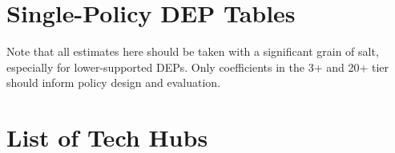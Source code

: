 \documentclass[doublespace,nopageskip]{UVAthesis}
\renewcommand{\arraystretch}{1.2}
\begin{document}
\begin{appendices}
\begin{figure}
    \label{fig:punjabispeakers}
\end{figure}
\FloatBarrier
\chapter{Single-Policy DEP Tables}
\label{app:appendixB}
Note that all estimates here should be taken with a significant grain of salt, especially for lower-supported DEPs. Only coefficients in the 3+ and 20+ tier should inform policy design and evaluation.

\begingroup
\footnotesize
{}


\endgroup

\chapter{List of Tech Hubs}
\label{app:appendixC}

\begin{table}[!htbp]
\centering
\caption{Candidate single-firm-dominated technology localities and corresponding MET2013 codes}
\label{tab:single_firm_tech_localities}
\tiny
\setlength{\tabcolsep}{2pt}
\renewcommand{\arraystretch}{1.03}


\end{table}
\end{appendices}
\end{document}

